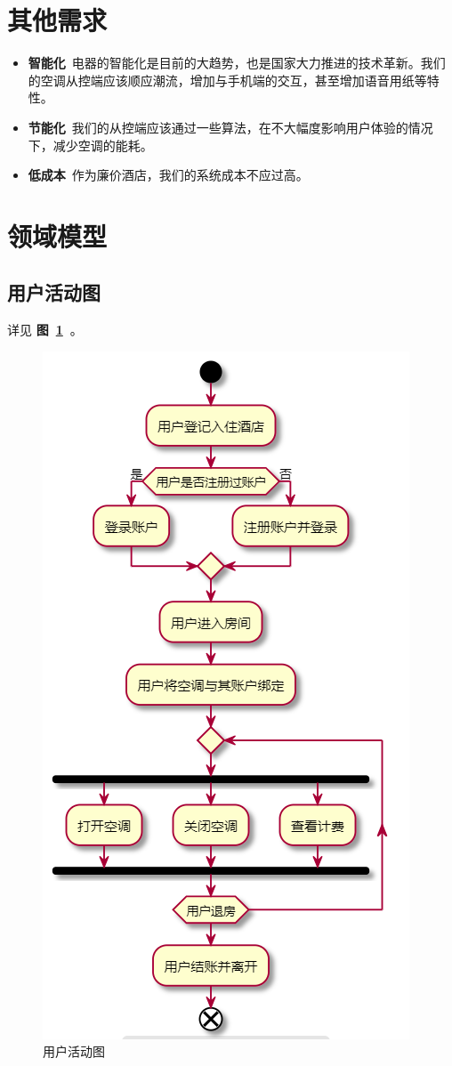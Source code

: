 \documentclass[blue,normal,cn]{elegantnote}
\begin{document}
\section{其他需求}

\begin{itemize}
	\item \textbf{智能化}\ 电器的智能化是目前的大趋势，也是国家大力推进的技术革新。我们的空调从控端应该顺应潮流，增加与手机端的交互，甚至增加语音用纸等特性。
	\item \textbf{节能化}\ 我们的从控端应该通过一些算法，在不大幅度影响用户体验的情况下，减少空调的能耗。
	\item \textbf{低成本}\ 作为廉价酒店，我们的系统成本不应过高。
\end{itemize}

\section{领域模型}

\subsection{用户活动图}

详见 \textbf{图~\ref{fig:user}~}。

\begin{figure}[!htbp]
	\centering
	\includegraphics[width=.5\textwidth]{user}
	\caption{用户活动图}
	\label{fig:user}
\end{figure}
\end{document}

